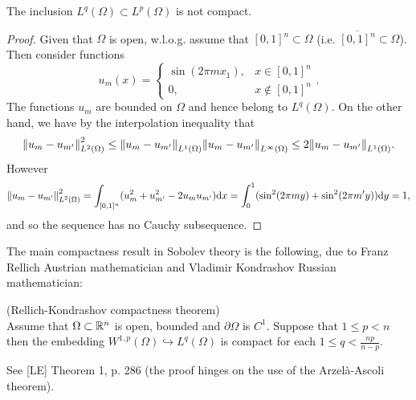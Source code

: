 \documentclass[11pt]{article}
\begin{document}
    		\begin{lemma}
    		The inclusion $L^q(\Omega)\subset L^p(\Omega)$ is not compact.
    		\end{lemma}
    		\begin{proof}
    			Given that $\Omega$ is open, w.l.o.g. assume that $[0,1]^n\subset\Omega$ (i.e. $\overline{[0,1]^n}\subset\Omega$). Then consider functions
    			\begin{equation*}
    				u_m(x)=\begin{cases}
    					\sin(2\pi m x_1), & x\in[0,1]^n\\
    					0, & x\notin[0,1]^n
    				\end{cases}.
    			\end{equation*}
    			The functions $u_m$ are bounded on $\Omega$ and hence belong to $L^q(\Omega)$. On the other hand, we have by the interpolation inequality that
    			\begin{equation*}
    				\norm{u_m-u_{m^\prime}}^2_{L^2(\Omega)}\le\norm{u_m-u_{m^\prime}}_{L^1(\Omega)}\norm{u_m-u_{m^\prime}}_{L^\infty(\Omega)}\le 2\norm{u_m-u_{m^\prime}}_{L^1(\Omega)}.
    			\end{equation*}
    			 However
    			\begin{equation*}
    				\norm{u_m-u_{m^\prime}}^2_{L^2(\Omega)}=\int_{[0,1]^n}(u_m^2+u^2_{m^\prime}-2u_mu_{m^\prime})\mathrm{d}x=\int_{0}^1(\sin^2(2\pi my)+\sin^2(2\pi m^\prime y))\mathrm{d}y=1,
    			\end{equation*}
    			and so the sequence has no Cauchy subsequence.
    		\end{proof}
    
    		The main compactness result in Sobolev theory is the following, due to Franz Rellich Austrian mathematician and Vladimir Kondrashov Russian mathematician:
    
    		\begin{thm}\label{Rellich-Kondrashov}
    			(Rellich-Kondrashov compactness theorem)\\
    			Assume that $\Omega\subset\mathbb{R}^n$ is open, bounded and $\partial\Omega$ is $C^1$. Suppose that $1\le p<n$ then the embedding $W^{1,p}(\Omega)\hookrightarrow L^q(\Omega)$ is compact for each $1\le q<\frac{np}{n-p}$.
    		\end{thm}
    		\begin{pproof}
    			See [LE] Theorem 1, p. 286 (the proof hinges on the use of the Arzel{\`a}-Ascoli theorem).
    		\end{pproof}
    
\end{document}
